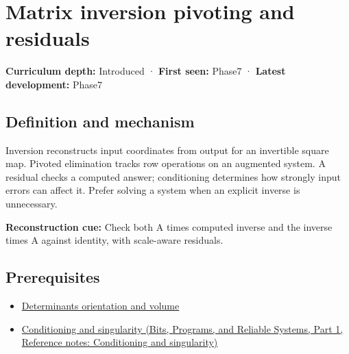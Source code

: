 \hypertarget{appendix-48d2e66378ab}{}\label{referencestart:appendix-48d2e66378ab}
\section{Matrix inversion pivoting and residuals}\label{appendix-48d2e66378ab-matrix-inversion-pivoting-and-residuals}

\hypertarget{appendix-48d2e66378ab-matrix-inversion-pivoting-and-residuals}{}

\textbf{Curriculum depth:} Introduced · \textbf{First seen:} Phase7 · \textbf{Latest development:} Phase7

\begin{allmightroledefinition}

\subsection{Definition and mechanism}\label{appendix-48d2e66378ab-definition-and-mechanism}

\hypertarget{appendix-48d2e66378ab-definition-and-mechanism}{}

Inversion reconstructs input coordinates from output for an invertible square map. Pivoted elimination tracks row operations on an augmented system. A residual checks a computed answer; conditioning determines how strongly input errors can affect it. Prefer solving a system when an explicit inverse is unnecessary.

\end{allmightroledefinition}

\textbf{Reconstruction cue:} Check both A times computed inverse and the inverse times A against identity, with scale-aware residuals.

\subsection{Prerequisites}\label{appendix-48d2e66378ab-prerequisites}

\hypertarget{appendix-48d2e66378ab-prerequisites}{}

\begin{itemize}
\tightlist
\item
  \hyperref[appendix-da478be01d02]{Determinants orientation and volume}
\item
  \href{../01-Bits-Programs-and-Reliable-Systems-P01/main.pdf\#appendix-8f6a01f284a7}{Conditioning and singularity (Bits, Programs, and Reliable Systems, Part 1, Reference notes: Conditioning and singularity)}
\end{itemize}

